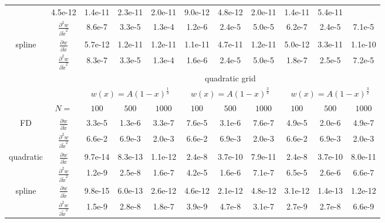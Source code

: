 \begin{tabular}{cc|c|c|c|c|c|c|c|c|c|}
  &4.5e-12  &1.4e-11  &2.3e-11  &2.0e-11  &9.0e-12  &4.8e-12  &2.0e-11  &1.4e-11  &5.4e-11
\\ \cline{2-11}
\multicolumn{1}{|c|}{}                        &
\multicolumn{1}{|c|}{$\frac{\partial^2 w}{\partial \tilde x^2}$}
  &8.6e-7  &3.3e-5  &1.3e-4  &1.2e-6  &2.4e-5  &5.0e-5  &6.2e-7  &2.4e-5  &7.1e-5
\\ \cline{1-11}
\multicolumn{1}{|c|}{\multirow{2}{*}{spline}} &
\multicolumn{1}{|c|}{$\frac{\partial w}{\partial \tilde x}$}
  &5.7e-12  &1.2e-11  &1.2e-11  &1.1e-11  &4.7e-11  &1.2e-11  &5.0e-12  &3.3e-11  &1.1e-10
\\ \cline{2-11}
\multicolumn{1}{|c|}{}                        &
\multicolumn{1}{|c|}{$\frac{\partial^2 w}{\partial \tilde x^2}$}
  &8.3e-7  &3.3e-5  &1.3e-4  &1.6e-6  &2.4e-5  &5.0e-5  &1.8e-7  &2.5e-5  &7.2e-5
\\ \cline{1-11}
& & \multicolumn{9}{|c|}{quadratic grid}
\\ \cline{3-11}
& & \multicolumn{3}{|c|}{$w(x)=A(1-x)^\frac{1}{3}$} &  \multicolumn{3}{|c|}{$w(x)=A(1-x)^\frac{2}{3}$} &  \multicolumn{3}{|c|}{$w(x)=A(1-x)^\frac{3}{2}$}
\\ \cline{2-11}
& \multicolumn{1}{|c|}{$N=$} & $100$ & $500$ & $1000$ & $100$ & $500$ & $1000$ & $100$ & $500$ & $1000$
\\ \cline{1-11}
\multicolumn{1}{|c|}{\multirow{2}{*}{FD}} &
\multicolumn{1}{|c|}{$\frac{\partial w}{\partial \tilde x}$}
  &3.3e-5  &1.3e-6  &3.3e-7  &7.6e-5  &3.1e-6  &7.6e-7  &4.9e-5  &2.0e-6  &4.9e-7
\\ \cline{2-11}
\multicolumn{1}{|c|}{}                        &
\multicolumn{1}{|c|}{$\frac{\partial^2 w}{\partial \tilde x^2}$}
  &6.6e-2  &6.9e-3  &2.0e-3  &6.6e-2  &6.9e-3  &2.0e-3  &6.6e-2  &6.9e-3  &2.0e-3
\\ \cline{1-11}
\multicolumn{1}{|c|}{\multirow{2}{*}{quadratic}} &
\multicolumn{1}{|c|}{$\frac{\partial w}{\partial \tilde x}$}
  &9.7e-14  &8.3e-13  &1.1e-12  &2.4e-8  &3.7e-10  &7.9e-11  &2.4e-8  &3.7e-10  &8.0e-11
\\ \cline{2-11}
\multicolumn{1}{|c|}{}                        &
\multicolumn{1}{|c|}{$\frac{\partial^2 w}{\partial \tilde x^2}$}
  &1.2e-9  &2.5e-8  &1.6e-7  &4.2e-5  &1.6e-6  &7.1e-7  &6.5e-5  &2.6e-6  &6.6e-7
\\ \cline{1-11}
\multicolumn{1}{|c|}{\multirow{2}{*}{spline}} &
\multicolumn{1}{|c|}{$\frac{\partial w}{\partial \tilde x}$}
  &9.8e-15  &6.0e-13  &2.6e-12  &4.6e-12  &2.1e-12  &4.8e-12  &3.1e-12  &1.4e-13  &1.2e-12
\\ \cline{2-11}
\multicolumn{1}{|c|}{}                        &
\multicolumn{1}{|c|}{$\frac{\partial^2 w}{\partial \tilde x^2}$}
  &1.5e-9  &2.8e-8  &1.8e-7  &3.9e-9  &4.7e-8  &3.1e-7  &2.7e-9  &2.7e-8  &6.6e-9
\\ \cline{1-11}
\end{tabular}
